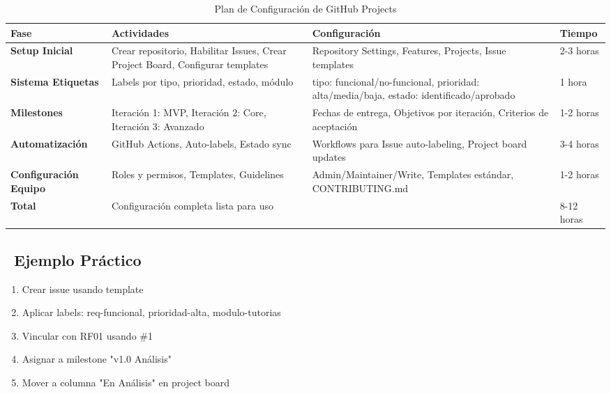 \documentclass[12pt,a4paper]{article}
\begin{document}
\begin{table}[H]
\centering
\caption{Plan de Configuración de GitHub Projects}
\begin{tabular}{|p{3cm}|p{4.5cm}|p{4.5cm}|p{3cm}|}
\hline
\rowcolor{headercolor!30}
\textbf{\color{white}Fase} & \textbf{\color{white}Actividades} & \textbf{\color{white}Configuración} & \textbf{\color{white}Tiempo} \\
\hline
\textbf{Setup Inicial} & 
Crear repositorio, Habilitar Issues, Crear Project Board, Configurar templates & 
Repository Settings, Features, Projects, Issue templates & 
2-3 horas \\
\hline
\textbf{Sistema Etiquetas} & 
Labels por tipo, prioridad, estado, módulo & 
tipo: funcional/no-funcional, prioridad: alta/media/baja, estado: identificado/aprobado & 
1 hora \\
\hline
\textbf{Milestones} & 
Iteración 1: MVP, Iteración 2: Core, Iteración 3: Avanzado & 
Fechas de entrega, Objetivos por iteración, Criterios de aceptación & 
1-2 horas \\
\hline
\textbf{Automatización} & 
GitHub Actions, Auto-labels, Estado sync & 
Workflows para Issue auto-labeling, Project board updates & 
3-4 horas \\
\hline
\textbf{Configuración Equipo} & 
Roles y permisos, Templates, Guidelines & 
Admin/Maintainer/Write, Templates estándar, CONTRIBUTING.md & 
1-2 horas \\
\hline
\hline
\rowcolor{successgreen!30}
\textbf{Total} & \multicolumn{2}{|p{9cm}|}{Configuración completa lista para uso} & 8-12 horas \\
\hline
\end{tabular}
\end{table}

\subsection{\faLightbulb\ Ejemplo Práctico}

\begin{tcolorbox}[colback=warningorange!10, colframe=warningorange, rounded corners, title=\faClipboardList\ Crear RF02 - Solicitud de tutorías]
\begin{enumerate}[itemsep=0.3em]
    \item Crear issue usando template
    \item Aplicar labels: req-funcional, prioridad-alta, modulo-tutorias
    \item Vincular con RF01 usando \#1
    \item Asignar a milestone "v1.0 Análisis"
    \item Mover a columna "En Análisis" en project board
\end{enumerate}
\end{tcolorbox}
\end{document}
